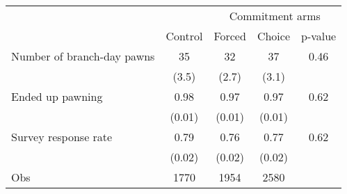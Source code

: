 \begin{tabular}{lcccc}
\toprule
      &       & \multicolumn{3}{c}{Commitment arms} \\
\cmidrule{3-5}      & Control & Forced & Choice & p-value \\
\midrule
\midrule
Number of branch-day pawns & 35    & 32    & 37    & 0.46 \\
      & (3.5) & (2.7) & (3.1) &  \\
\multicolumn{1}{p{12.82em}}{Ended up pawning} & 0.98  & 0.97  & 0.97  & 0.62 \\
      & (0.01) & (0.01) & (0.01) &  \\
Survey response rate & 0.79  & 0.76  & 0.77  & 0.62 \\
      & (0.02) & (0.02) & (0.02) &  \\
\midrule
Obs   & 1770  & 1954  & 2580  &  \\
\bottomrule
\bottomrule
\end{tabular}%
